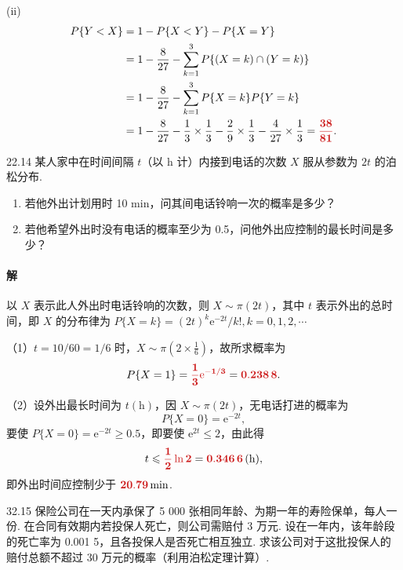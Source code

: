 \documentclass[11pt, UTF8]{ctexart}
\newcommand{\ans}[1]{\mathbf{\color{fred}#1}}
\begin{document}
(ii)
\begin{align*}
    P\{Y < X\} &= 1 - P\{X < Y\} - P\{X = Y\} \\
    &= 1 - \frac{8}{27} - \sum_{k=1}^{3} P\{(X = k) \cap (Y = k)\} \\
    &= 1 - \frac{8}{27} - \sum_{k=1}^{3} P\{X = k\}P\{Y = k\} \\
    &= 1 - \frac{8}{27} - \frac{1}{3} \times \frac{1}{3} - \frac{2}{9} \times \frac{1}{3} - \frac{4}{27} \times \frac{1}{3} = \ans{\frac{38}{81}}.
\end{align*}

\vspace{1.5em}

\begin{problem}{2}{2.14}
某人家中在时间间隔 $t$（以 h 计）内接到电话的次数 $X$ 服从参数为 $2t$ 的泊松分布.
\begin{enumerate}
    \item[(1)] 若他外出计划用时 10 min，问其间电话铃响一次的概率是多少？
    \item[(2)] 若他希望外出时没有电话的概率至少为 0.5，问他外出应控制的最长时间是多少？
\end{enumerate}
\end{problem}

\paragraph{\color{fblue}解}
以 $X$ 表示此人外出时电话铃响的次数，则 $X \sim \pi(2t)$，其中 $t$ 表示外出的总时间，即 $X$ 的分布律为 $P\{X=k\} = (2t)^k \mathrm{e}^{-2t}/k!, k=0,1,2,\cdots$

（1）$t = 10/60 = 1/6$ 时，$X \sim \pi\left(2 \times \frac{1}{6}\right)$，故所求概率为
\[ P\{X=1\} =\ans{ \frac{1}{3} \mathrm{e}^{-1/3} }= \ans{0.238 \,8}. \]

（2）设外出最长时间为 $t(\mathrm{h})$，因 $X \sim \pi(2t)$，无电话打进的概率为
\[ P\{X=0\} = \mathrm{e}^{-2t}, \]
要使 $P\{X=0\} = \mathrm{e}^{-2t} \geqslant 0.5$，即要使 $\mathrm{e}^{2t} \leqslant 2$，由此得
\[ t \leqslant \ans{\frac{1}{2} \ln 2} = \ans{0.346\,6} \,(\mathrm{h}), \]
即外出时间应控制少于 $\ans{20.79} \min$.

\vspace{1.5em}

\begin{problem}{3}{2.15}
保险公司在一天内承保了 5 000 张相同年龄、为期一年的寿险保单，每人一份. 在合同有效期内若投保人死亡，则公司需赔付 3 万元. 设在一年内，该年龄段的死亡率为 0.001 5，且各投保人是否死亡相互独立. 求该公司对于这批投保人的赔付总额不超过 30 万元的概率（利用泊松定理计算）.
\end{problem}
\end{document}
